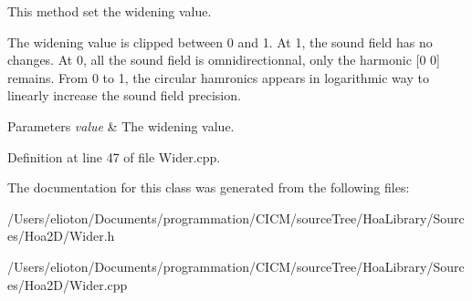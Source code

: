 This method set the widening value. 

The widening value is clipped between 0 and 1. At 1, the sound field has no changes. At 0, all the sound field is omnidirectionnal, only the harmonic \mbox{[}0 0\mbox{]} remains. From 0 to 1, the circular hamronics appears in logarithmic way to linearly increase the sound field precision.


\begin{DoxyParams}{Parameters}
{\em value} & The widening value. \\
\hline
\end{DoxyParams}


Definition at line 47 of file Wider.\-cpp.



The documentation for this class was generated from the following files\-:\begin{DoxyCompactItemize}
\item 
/\-Users/elioton/\-Documents/programmation/\-C\-I\-C\-M/source\-Tree/\-Hoa\-Library/\-Sources/\-Hoa2\-D/Wider.\-h\item 
/\-Users/elioton/\-Documents/programmation/\-C\-I\-C\-M/source\-Tree/\-Hoa\-Library/\-Sources/\-Hoa2\-D/Wider.\-cpp\end{DoxyCompactItemize}
